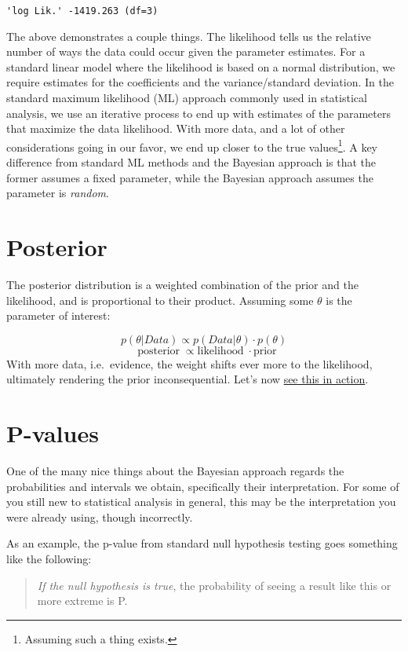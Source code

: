 \documentclass[]{book}
\let\rmarkdownfootnote\footnote%
\def\footnote{\protect\rmarkdownfootnote}
\begin{document}
\begin{verbatim}
'log Lik.' -1419.263 (df=3)
\end{verbatim}

The above demonstrates a couple things. The likelihood tells us the
relative number of ways the data could occur given the parameter
estimates. For a standard linear model where the likelihood is based on
a normal distribution, we require estimates for the coefficients and the
variance/standard deviation. In the standard maximum likelihood (ML)
approach commonly used in statistical analysis, we use an iterative
process to end up with estimates of the parameters that maximize the
data likelihood. With more data, and a lot of other considerations going
in our favor, we end up closer to the true values\footnote{Assuming such
  a thing exists.}. A key difference from standard ML methods and the
Bayesian approach is that the former assumes a fixed parameter, while
the Bayesian approach assumes the parameter is \emph{random}.

\section{Posterior}\label{posterior}

The {posterior} distribution is a weighted combination of the prior and
the likelihood, and is proportional to their product. Assuming some
\(\theta\) is the parameter of interest:

\[ p(\theta|Data) \propto p(Data|\theta) \cdot p(\theta) \]
\[ \;\;\mathrm{posterior} \;\propto \mathrm{likelihood} \;\!\cdot \mathrm{prior} \]
With more data, i.e.~evidence, the weight shifts ever more to the
likelihood, ultimately rendering the prior inconsequential. Let's now
\href{http://micl.shinyapps.io/prior2post/}{see this in action}.

\section{P-values}\label{p-values}

One of the many nice things about the Bayesian approach regards the
probabilities and intervals we obtain, specifically their
interpretation. For some of you still new to statistical analysis in
general, this may be the interpretation you were already using, though
incorrectly.

As an example, the p-value from standard {null hypothesis testing} goes
something like the following:

\begin{quote}
\emph{If the null hypothesis is true}, the probability of seeing a
result like this or more extreme is P.
\end{quote}
\end{document}
